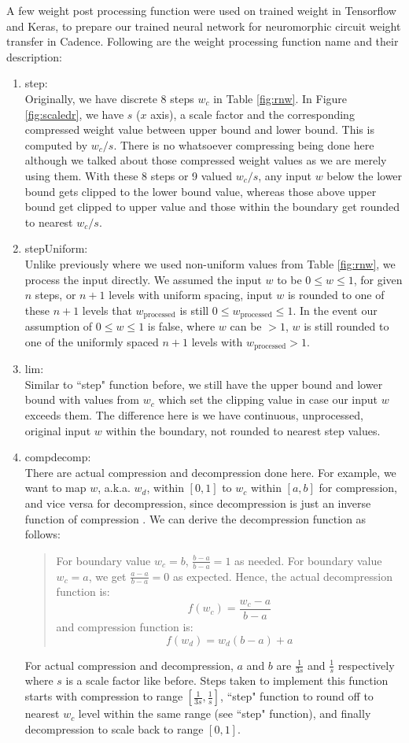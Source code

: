 A few weight post processing function were used on trained weight in Tensorflow and Keras, to prepare our trained neural network for neuromorphic circuit weight transfer in Cadence. Following are the weight processing function name and their description:
\begin{enumerate}
	\item step:\\
	Originally, we have 
	discrete 8 steps $w_{c}$ in Table \ref{fig:rnw}. In Figure \ref{fig:scaledr}, we have $s$ ($x$ axis), a scale factor and the corresponding compressed weight value between upper bound and lower bound.  This is computed by $w_{c}/s$. There is no whatsoever compressing being done here although we talked about those compressed weight values as we are merely using them. With these 8 steps or 9 valued $w_{c}/s$, any input $w$ below the lower bound gets clipped to the lower bound value, whereas those above upper bound get clipped to upper value and those within the boundary get rounded to nearest $w_{c}/s$.
	\item stepUniform:\\
	Unlike previously where we used non-uniform values from Table \ref{fig:rnw}, we process the input directly. We assumed the input $w$ to be $0 \leq w \leq 1$, for given $n$ steps, or $n+1$ levels with uniform spacing, input $w$ is rounded to one of these $n+1$ levels that $w_{\text{processed}}$ is still $0 \leq w_{\text{processed}} \leq 1$. In the event our assumption of $0 \leq w \leq 1$ is false, where $w$ can be $>1$, $w$ is still rounded to one of the uniformly spaced $n+1$ levels with $w_{\text{processed}} > 1$.
	\item lim:\\
	Similar to ``step" function before, we still have the upper bound and lower bound with values from $w_c$ which set the clipping value in case our input $w$ exceeds them. The difference here is we have continuous, unprocessed, original input $w$ within the boundary, not rounded to nearest step values.
	\item compdecomp:\\
	There are actual compression and decompression done here. For example, we want to map $w$, a.k.a. $w_d$, within $[0,1]$ to $w_c$ within $[a,b]$ for compression, and vice versa for decompression, since decompression is just an inverse function of compression . We can derive the decompression function as follows:
	\begin{quote}
		For boundary value $w_c=b$, $\frac{b-a}{b-a}=1$ as needed.
		For boundary value $w_c=a$, we get $\frac{a-a}{b-a}=0$ as expected.
		Hence, the actual decompression function is:
		$$f(w_c) = \frac{w_c-a}{b-a}$$
		and compression function is:
		$$f(w_d) = w_d(b-a)+a$$
	\end{quote}
	For actual compression and decompression,
	$a$ and $b$ are $\frac{1}{3s}$ and $\frac{1}{s}$ respectively where $s$ is a scale factor like before.
	Steps taken to implement this function starts with compression to range $[\frac{1}{3s},\frac{1}{s}]$, ``step" function to round off to nearest $w_c$ level within the same range (see ``step" function), and finally decompression to scale back to range $[0,1]$.
\end{enumerate}
